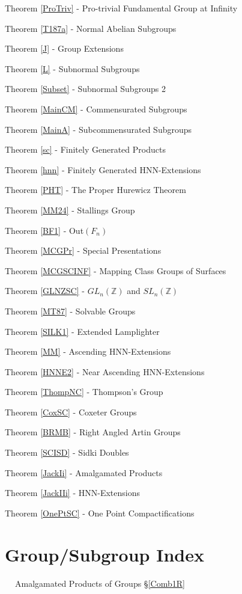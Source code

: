 \documentclass[12pt]{article}
\begin{document}
Theorem \ref{ProTriv} - Pro-trivial Fundamental Group at Infinity

Theorem \ref{T187a} - Normal Abelian Subgroups

Theorem \ref{J} - Group Extensions

Theorem \ref{L} - Subnormal Subgroups

Theorem \ref{Subset} - Subnormal Subgroups 2

Theorem \ref{MainCM} - Commensurated Subgroups

Theorem \ref{MainA} - Subcommensurated Subgroups

Theorem \ref{sc} -  Finitely Generated Products

Theorem \ref{hnn} - Finitely Generated HNN-Extensions 

Theorem \ref{PHT} - The Proper Hurewicz Theorem

Theorem \ref{MM24} - Stallings Group

Theorem \ref{BF1} - Out$(F_n)$

Theorem \ref{MCGPr} - Special Presentations 

Theorem \ref{MCGSCINF} - Mapping Class Groups of Surfaces

Theorem \ref{GLNZSC} - $GL_n(\mathbb Z)$ and $SL_n (\mathbb Z)$

Theorem \ref{MT87} - Solvable Groups

Theorem \ref{SILK1} - Extended Lamplighter

Theorem \ref{MM} - Ascending HNN-Extensions

Theorem \ref{HNNE2} - Near Ascending HNN-Extensions

Theorem \ref{ThompNC} - Thompson's Group

Theorem \ref{CoxSC} - Coxeter Groups

Theorem \ref{BRMB} - Right Angled Artin Groups

Theorem \ref{SCISD} - Sidki Doubles

Theorem \ref{JackIi} - Amalgamated Products

Theorem \ref{JackIIi} - HNN-Extensions

Theorem \ref{OnePtSC} - One Point Compactifications




\section{Group/Subgroup Index}\label{GSI}

$\ \ \ \ $ Amalgamated Products of Groups \S \ref{Comb1R}
\end{document}
